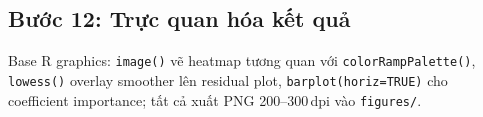 \subsection{Bước 12: Trực quan hóa kết quả}
\label{sec:buoc_12}
Base R graphics: \texttt{image()} vẽ heatmap tương quan với \texttt{colorRampPalette()}, \texttt{lowess()} overlay smoother lên residual plot, \texttt{barplot(horiz=TRUE)} cho coefficient importance; tất cả xuất PNG 200--300\,dpi vào \texttt{figures/}.

